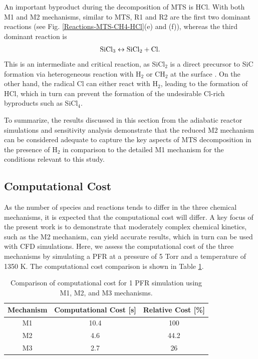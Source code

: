 \documentclass[final, letterpaper, square, comma, numbers, sort&compress]{elsarticle}
\begin{document}
An important byproduct during the decomposition of MTS is HCl. With both M1 and M2 mechanisms, similar to MTS, R1 and R2 are the first two dominant reactions (see Fig. \ref{Reactions-MTS-CH4-HCl}(e) and (f)), whereas the third dominant reaction is
\begin{align*}
    \rm SiCl_3 \leftrightarrow SiCl_2 + Cl.
\end{align*}
This is an intermediate and critical reaction, as SiCl$_2$ is a direct precursor to SiC formation via heterogeneous reaction with H$_2$ or CH$_2$ at the surface \cite{Papasouliotis1994}. On the other hand, the radical Cl can either react with H$_2$, leading to the formation of HCl, which in turn can prevent the formation of the undesirable Cl-rich byproducts such as SiCl$_4$.

To summarize, the results discussed in this section from the adiabatic reactor simulations and sensitivity analysis demonstrate that the reduced M2 mechanism can be considered adequate to capture the key aspects of MTS decomposition in the presence of H$_2$ in comparison to the detailed M1 mechanism for the conditions relevant to this study.

\subsection{Computational Cost}
As the number of species and reactions tends to differ in the three chemical mechanisms, it is expected that the computational cost will differ. A key focus of the present work is to demonstrate that moderately complex chemical kinetics, such as the M2 mechanism, can yield accurate results, which in turn can be used with CFD simulations. Here, we assess the computational cost of the three mechanisms by simulating a PFR at a pressure of 5 Torr and a temperature of 1350 K. The computational cost comparison is shown in Table \ref{table:2}.

\begin{table}[t]
    \centering
    \caption{Comparison of computational cost for 1 PFR simulation using M1, M2, and M3 mechanisms.}
    \label{table:2}
    \begin{tabular}{ | c | c | c | }
        \hline
        Mechanism & Computational Cost [s] & Relative Cost [\%] \\
        \hline
        M1 & 10.4 & 100 \\
        M2 & 4.6 & 44.2 \\
        M3 & 2.7 & 26 \\
        \hline
    \end{tabular}
\end{table}
\end{document}
